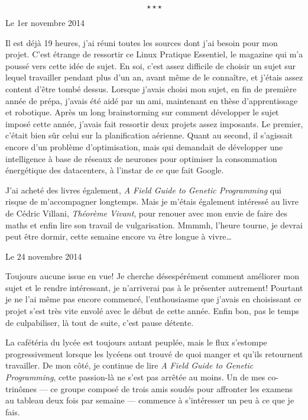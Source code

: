 \documentclass[12pt,final]{report} %
\newcommand{\stardelimiter}{
\[ \star \star \star \]
\newpage
}
\newcommand{\datemarge}[1]{%
   \newpage
        {\color{blue}#1}

}
\begin{document}
{\stardelimiter{}

\datemarge{Le 1er novembre 2014}

Il est déjà 19 heures, j'ai réuni toutes les sources dont j'ai besoin pour mon projet. 
C'est étrange de ressortir ce Linux Pratique Essentiel, le magazine qui m'a poussé vers cette idée de sujet. 
En soi, c'est assez difficile de choisir un sujet sur lequel travailler pendant plus d'un an, avant même de le connaître,
et j'étais assez content d'être tombé dessus.
Lorsque j'avais choisi mon sujet, en fin de première année de prépa, j'avais été aidé par un ami, maintenant en thèse d'apprentissage et robotique.
Après un long brainstorming sur comment développer le sujet imposé cette année, j'avais fait ressortir deux projets assez imposants.
Le premier, c'était bien sûr celui sur la planification aérienne. 
Quant au second, il s'agissait encore d'un problème d'optimisation, mais qui demandait de développer une intelligence à base de réseaux de neurones pour optimiser la consommation énergétique des datacenters, à l'instar de ce que fait Google.

J'ai acheté des livres également, \textit{A Field Guide to Genetic Programming} qui risque de m'accompagner longtemps.
Mais je m'étais également intéressé au livre de Cédric Villani, \textit{Théorème Vivant}, pour renouer avec mon envie de faire des maths et enfin lire son travail de vulgarisation. 
Mmmmh, l'heure tourne, je devrai peut être dormir, cette semaine encore va être longue à vivre\dots

\datemarge{Le 24 novembre 2014}

Toujours aucune issue en vue!
Je cherche désespérément comment améliorer mon sujet et le rendre intéressant, je n'arriverai pas à le présenter autrement!
Pourtant je ne l'ai même pas encore commencé, l'enthousiasme que j'avais en choisissant ce projet s'est très vite envolé avec le début de cette année.
Enfin bon, pas le temps de culpabiliser, là tout de suite, c'est pause détente. 

La cafétéria du lycée est toujours autant peuplée, mais le flux s'estompe progressivement lorsque les lycéens ont trouvé de quoi manger et qu'ils retournent travailler. 
De mon côté, je continue de lire \textit{A Field Guide to Genetic Programming}, cette passion-là ne s'est pas arrêtée au moins.
Un de mes co-trinômes --- ce groupe composé de trois amis soudés pour affronter les examens au tableau deux fois par semaine --- commence à s'intéresser un peu à ce que je fais.

}
\end{document}
